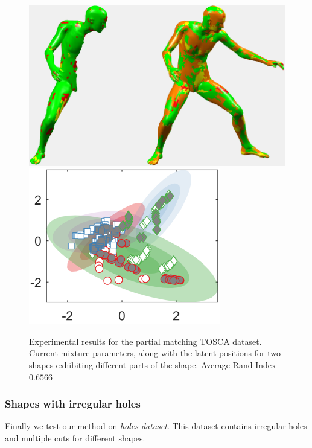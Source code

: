 \documentclass[]{article}
\begin{document}
\begin{figure}[ht!]
	\centering
	
	\includegraphics[width=0.5\linewidth]{img/partialDavid1MVMMexp1}
	\includegraphics[width=0.35\linewidth]{img/partialDavid1MVMMexp3}
	\caption{Experimental results for the partial matching TOSCA dataset. Current mixture parameters, along with the latent positions for two shapes exhibiting different parts of the shape. Average Rand Index $0.6566$ }
\end{figure}

\subsubsection{Shapes with irregular holes}

Finally we test our method on  \textit{holes dataset}. This dataset contains irregular holes and multiple cuts for different shapes.
\end{document}
